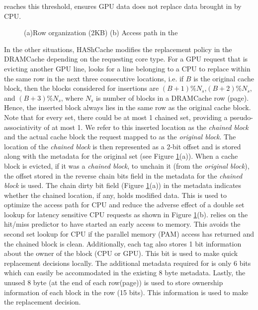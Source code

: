 reaches this threshold, \chaining ensures GPU data does not replace data brought in by CPU. 
\begin{figure}[htb]
    \centering
    \scalebox{0.52}{\chainaccess}
    \caption{\cachename (a)Row organization (2KB) (b) Access path in the \cachename}
    \label{fig:chain-access}
\end{figure}
In the other situations, HAShCache modifies the replacement policy in the DRAMCache depending on the requesting core type. For a GPU request that is evicting another GPU line, \cachename looks for a line belonging to a CPU to replace within the same row in the next three consecutive locations,
i.e. if $B$ is the original cache block, then the blocks considered for insertions are $(B+1)\%N_s$,$(B+2)\%N_s$, and $(B+3)\%N_s$, where $N_s$ is number of blocks in a DRAMCache row (page). Hence, the inserted block always lies in the same row as the original cache block. Note that for every set, there could be at most 1 chained set, providing a pseudo-associativity of at most 1.  
We refer to this inserted location as the \textit{chained block} and the actual cache block the request mapped to as the \textit{original block}. The location of the \textit{chained block} is then represented as a 2-bit offset and is stored along with the metadata for the original set (see Figure \ref{fig:chain-access}(a)). When a cache block is evicted, if it was a \textit{chained block}, to unchain it (from the \textit{original block}), the offset stored in the reverse chain bits field in the metadata for the \textit{chained block} is used.  
The chain dirty bit field (Figure \ref{fig:chain-access}(a)) in the metadata indicates whether the chained location, if any, holds modified data. This is used to optimize the access path for CPU and reduce the adverse effect of a double set lookup for latency sensitive CPU requests as shown in Figure \ref{fig:chain-access}(b). \chaining relies on the hit/miss predictor to have started an early access to memory. This avoids the second set lookup for CPU if the parallel memory (PAM) access has returned and the chained block is clean. 
Additionally, each tag also stores 1 bit information about the owner of the block (CPU or GPU). This bit is used to make quick replacement decisions locally. The additional metadata required for \chaining is only 6 bits which can easily be accommodated in the existing 8 byte metadata. Lastly, the unused 8 byte (at the end of each row(page)) is used to store ownership information of each block in the row (15 bits). This information is used to make the \chaining replacement decision.

